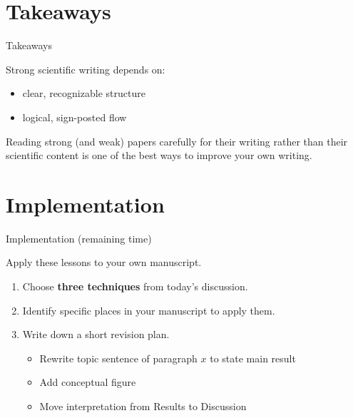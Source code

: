 \documentclass{beamer}
\begin{document}
\section{Takeaways}
\begin{frame}{Takeaways}

Strong scientific writing depends on:

\begin{itemize}
\item clear, recognizable structure
\item logical, sign-posted flow
\end{itemize}

\vspace{0.4cm}

Reading strong (and weak) papers carefully for their writing rather than their scientific content
is one of the best ways to improve your own writing.

\end{frame}
\section{Implementation}
\begin{frame}{Implementation (remaining time)}

Apply these lessons to your own manuscript.

\begin{enumerate}
    \item  Choose \textbf{three techniques} from today's discussion.
    \item  Identify specific places in your manuscript to apply them.
    \item  Write down a short revision plan.
        \begin{itemize}
            \item Rewrite topic sentence of paragraph $x$ to state main result
            \item Add conceptual figure
            \item Move interpretation from Results to Discussion
        \end{itemize}
\end{enumerate}
\end{frame}
\end{document}
